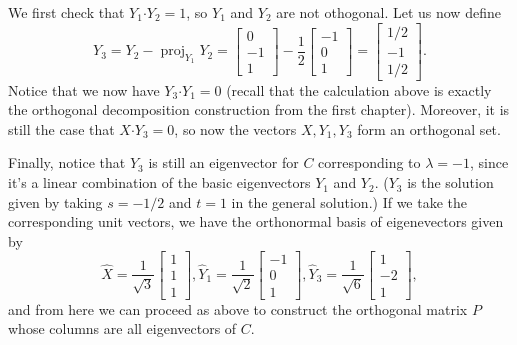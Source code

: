 \documentclass[12pt]{article}
\newcommand{\dotp}{\boldsymbol{\cdot}}
\newcommand{\bbm}{\begin{bmatrix}}
\newcommand{\ebm}{\end{bmatrix}}
\DeclareMathOperator{\proj}{proj}
\begin{document}
\begin{enumerate}
\begin{enumerate}
\bigskip

We first check that $Y_1\dotp Y_2 = 1$, so $Y_1$ and $Y_2$ are not othogonal. Let us now define
\[
 Y_3 = Y_2- \proj_{Y_1}Y_2 = \bbm 0\\-1\\1\ebm - \dfrac{1}{2}\bbm -1\\0\\1\ebm = \bbm 1/2\\-1\\1/2\ebm.
\]
Notice that we now have $Y_3\dotp Y_1 = 0$ (recall that the calculation above is exactly the orthogonal decomposition construction from the first chapter). Moreover, it is still the case that $X\dotp Y_3 = 0$, so now the vectors $X, Y_1, Y_3$ form an orthogonal set. 

Finally, notice that $Y_3$ is still an eigenvector for $C$ corresponding to $\lambda = -1$, since it's a linear combination of the basic eigenvectors $Y_1$ and $Y_2$. ($Y_3$ is the solution given by taking $s=-1/2$ and $t=1$ in the general solution.) If we take the corresponding unit vectors, we have the orthonormal basis of eigenevectors given by
\[
 \hat{X} = \frac{1}{\sqrt{3}}\bbm 1\\1\\1\ebm, \hat{Y}_1 = \frac{1}{\sqrt{2}}\bbm -1\\0\\1\ebm, \hat{Y}_3= \frac{1}{\sqrt{6}}\bbm 1\\-2\\1\ebm,
\]
and from here we can proceed as above to construct the orthogonal matrix $P$ whose columns are all eigenvectors of $C$.
\end{enumerate}

 \end{enumerate}
\end{document}
